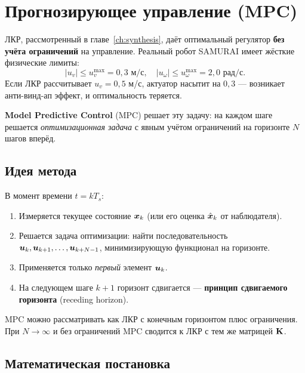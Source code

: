 \chapter{Прогнозирующее управление (MPC)}
\label{ch:mpc}

ЛКР, рассмотренный в главе~\ref{ch:synthesis}, даёт оптимальный регулятор
\textbf{без учёта ограничений} на управление. Реальный робот SAMURAI имеет
жёсткие физические лимиты:
\begin{equation}
  |u_v| \leq u_v^{\max} = 0{,}3 \text{ м/с}, \quad
  |u_\omega| \leq u_\omega^{\max} = 2{,}0 \text{ рад/с}.
  \label{eq:robot_limits}
\end{equation}
Если ЛКР рассчитывает $u_v = 0{,}5$ м/с, актуатор насытит на $0{,}3$ ---
возникает анти-винд-ап эффект, и оптимальность теряется.

\textbf{Model Predictive Control} (MPC) решает эту задачу: на каждом
шаге решается \emph{оптимизационная задача} с явным учётом ограничений
на горизонте $N$ шагов вперёд.

\section{Идея метода}
\label{sec:mpc_idea}

В момент времени $t = kT_s$:
\begin{enumerate}
  \item Измеряется текущее состояние $\bm{x}_k$ (или его оценка
        $\hat{\bm{x}}_k$ от наблюдателя).
  \item Решается задача оптимизации: найти последовательность
        $\bm{u}_k, \bm{u}_{k+1}, \ldots, \bm{u}_{k+N-1}$,
        минимизирующую функционал на горизонте.
  \item Применяется только \emph{первый} элемент $\bm{u}_k$.
  \item На следующем шаге $k+1$ горизонт сдвигается ---
        \textbf{принцип сдвигаемого горизонта} (receding horizon).
\end{enumerate}

\begin{notebox}
MPC можно рассматривать как ЛКР с конечным горизонтом плюс ограничения.
При $N \to \infty$ и без ограничений MPC сводится к ЛКР с тем же
матрицей $\mathbf{K}$.
\end{notebox}

\section{Математическая постановка}
\label{sec:mpc_formulation}

